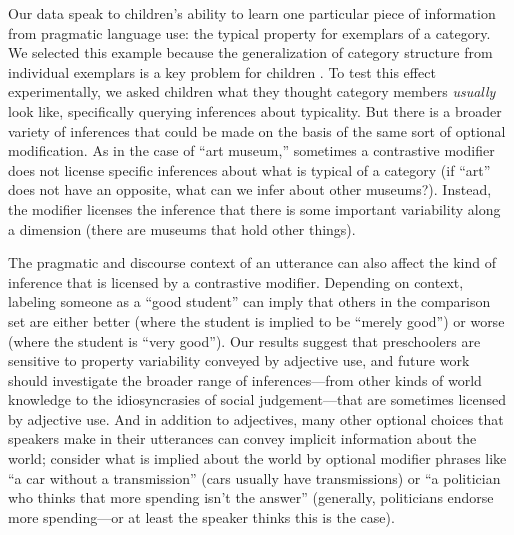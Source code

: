 \documentclass[man]{apa2}
\begin{document}
Our data speak to children's ability to learn one particular piece of information from pragmatic language use: the typical property for exemplars of a category. We selected this example because the generalization of category structure from individual exemplars is a key problem for children \cite{markman1991}. To test this effect experimentally, we asked children what they thought category members \emph{usually} look like, specifically querying inferences about typicality. But there is a broader variety of inferences that could be made on the basis of the same sort of optional modification. As in the case of ``art museum,'' sometimes a contrastive modifier does not license specific inferences about what is typical of a category (if ``art'' does not have an opposite, what can we infer about other museums?). Instead, the modifier licenses the inference that there is some important variability along a dimension (there are museums that hold other things). 

The pragmatic and discourse context of an utterance can also affect the kind of inference that is licensed by a contrastive modifier. Depending on context, labeling someone as a ``good student'' can imply that others in the comparison set are either better (where the student is implied to be ``merely good'') or worse (where the student is ``very good''). Our results suggest that preschoolers are sensitive to property variability conveyed by adjective use, and future work should investigate the broader range of inferences---from other kinds of world knowledge to the idiosyncrasies of social judgement---that are sometimes licensed by adjective use. And in addition to adjectives, many other optional choices that speakers make in their utterances can convey implicit information about the world; consider what is implied about the world by optional modifier phrases like ``a car without a transmission'' (cars usually have transmissions) or ``a politician who thinks that more spending isn't the answer'' (generally, politicians endorse more spending---or at least the speaker thinks this is the case). 

\end{document}
